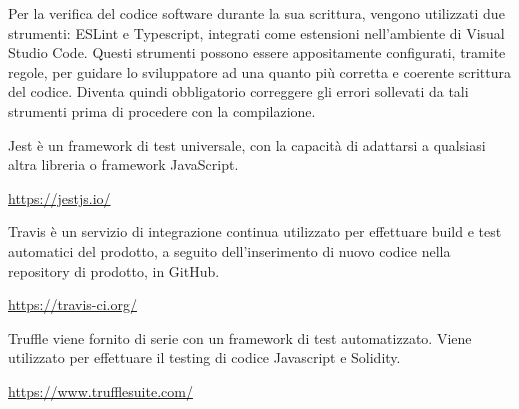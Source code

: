     	Per la verifica del codice software durante la sua scrittura, vengono utilizzati due strumenti: ESLint e Typescript, integrati come estensioni nell'ambiente di Visual Studio Code. Questi strumenti possono essere appositamente configurati, tramite regole, per guidare lo sviluppatore ad una quanto più corretta e coerente scrittura del codice. Diventa quindi obbligatorio correggere gli errori sollevati da tali strumenti prima di procedere con la compilazione.
    	
    	Jest è un framework di test universale, con la capacità di adattarsi a qualsiasi altra libreria o framework JavaScript.
    	\begin{center}
    		\url{https://jestjs.io/}
    	\end{center}
    	
    	Travis è un servizio di integrazione continua utilizzato per effettuare build e test automatici del prodotto, a seguito dell'inserimento di nuovo codice nella repository di prodotto, in GitHub.
    	\begin{center}
    		\url{https://travis-ci.org/}
    	\end{center}
    
    	Truffle viene fornito di serie con un framework di test automatizzato. Viene utilizzato per effettuare il testing di codice Javascript e Solidity.
    	\begin{center}
    		\url{https://www.trufflesuite.com/}
    	\end{center}
	    
    	
